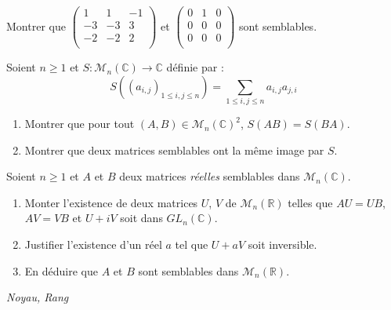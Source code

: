 \documentclass[a4paper,10pt]{report}
\begin{document}
\begin{Exercice}{} Montrer que $\begin{pmatrix}
1 & 1 & -1 \\
-3 & -3 & 3 \\
-2 & -2 & 2 \\
\end{pmatrix}$ et $\begin{pmatrix}
0 & 1 & 0 \\
0 & 0 & 0 \\
0 & 0 & 0 \\
\end{pmatrix}$ sont semblables.
\end{Exercice}

\begin{Exercice}{} Soient $n \geq 1$ et $S : \mathcal{M}_n(\mathbb{C}) \rightarrow \mathbb{C}$ définie par :
$$ S((a_{i,j})_{1 \leq i,j \leq n}) = \sum_{1 \leq i,j \leq n} a_{i,j} a_{j,i}$$

\begin{enumerate}
\item Montrer que pour tout $(A,B) \in \mathcal{M}_n(\mathbb{C})^2$, $S(AB)=S(BA)$.
\item Montrer que deux matrices semblables ont la même image par $S$.
\end{enumerate}
\end{Exercice}

\begin{Exercice}{} Soient $n \geq 1$ et $A$ et $B$ deux matrices \textit{réelles} semblables dans $\mathcal{M}_n(\mathbb{C})$.

\begin{enumerate}
\item Monter l'existence de deux matrices $U$, $V$ de $\mathcal{M}_n(\mathbb{R})$ telles que $AU=UB$, $AV=VB$ et $U+iV$ soit dans $GL_n(\mathbb{C})$.
\item Justifier l'existence d'un réel $a$ tel que $U+aV$ soit inversible.
\item En déduire que $A$ et $B$ sont semblables dans $\mathcal{M}_n(\mathbb{R})$.
\end{enumerate}
\end{Exercice} 



\medskip

\begin{center}
\textit{{ {\large Noyau, Rang}}}
\end{center}

\medskip
\end{document}
